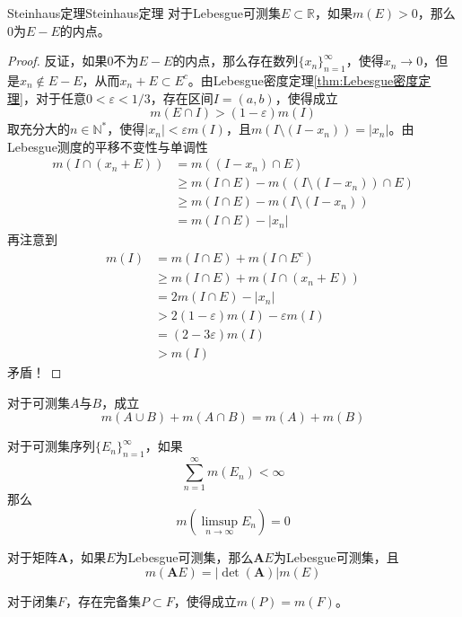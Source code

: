 \documentclass[lang = cn, scheme = chinese, thmcnt = section]{elegantbook}
\newcommand{\N}{\mathbb{N}}            %
\newcommand{\R}{\mathbb{R}}            %
\newcommand{\sub}{\subset}             %
\newcommand{\bs}{\boldsymbol}          %
\begin{document}
\begin{theorem}{Steinhaus定理}{Steinhaus定理}
	对于Lebesgue可测集$E\sub\R$，如果$m(E)>0$，那么$0$为$E-E$的内点。
\end{theorem}

\begin{proof}
	反证，如果$0$不为$E-E$的内点，那么存在数列$\{ x_n \}_{n=1}^{\infty}$，使得$x_n\to 0$，但是$x_n\notin E-E$，从而$x_n+E\sub E^c$。由Lebesgue密度定理\ref{thm:Lebesgue密度定理}，对于任意$0<\varepsilon<1/3$，存在区间$I=(a,b)$，使得成立%
	$$
	m(E\cap I)>(1-\varepsilon)m(I)
	$$
	取充分大的$n\in\N^*$，使得$|x_n|<\varepsilon m(I)$，且$m(I\setminus (I-x_n))=|x_n|$。由Lebesgue测度的平移不变性与单调性
	\begin{align*}
		m(I\cap (x_n+E))
		& = m((I-x_n)\cap E)\\
		& \ge m(I\cap E)-m((I\setminus (I-x_n))\cap E)\\
		& \ge m(I\cap E)-m(I\setminus (I-x_n))\\
		& = m(I\cap E)-|x_n|
	\end{align*}
	再注意到
	\begin{align*}
		m(I)
		& = m(I\cap E)+m(I\cap E^c)\\
		& \ge m(I\cap E)+m(I\cap (x_n+E))\\
		& = 2m(I\cap E)-|x_n|\\
		& >2(1-\varepsilon)m(I)-\varepsilon m(I)\\
		& = (2-3\varepsilon)m(I)\\
		& > m(I)
	\end{align*}
	矛盾！
\end{proof}

\begin{exercise}
	对于可测集$A$与$B$，成立%
	$$
	m(A\cup B)+m(A\cap B)=m(A)+m(B)
	$$
\end{exercise}

\begin{exercise}
	对于可测集序列$\{ E_n \}_{n=1}^{\infty}$，如果
	$$
	\sum_{n=1}^{\infty}{m(E_n)}<\infty
	$$
	那么
	$$
	m\left(\limsup_{n\to\infty}{E_n}\right)=0
	$$
\end{exercise}

\begin{exercise}
	对于矩阵$\bs{A}$，如果$E$为Lebesgue可测集，那么$\bs{A}E$为Lebesgue可测集，且%
	$$
	m(\bs{A}E)=|\det(\bs{A})|m(E)
	$$
\end{exercise}

\begin{exercise}
	对于闭集$F$，存在完备集$P\sub F$，使得成立$m(P)=m(F)$。
\end{exercise}
\end{document}
